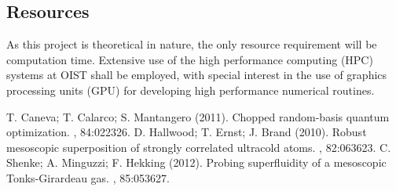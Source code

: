 \documentclass[fontsize=10pt, twocolumn]{scrartcl}	 %
\begin{document}

\subsection*{Resources}
As this project is theoretical in nature, the only resource requirement will be computation time. Extensive use of the high performance computing (HPC) systems
at OIST shall be employed, with special interest in the use of graphics processing units (GPU) for developing high performance numerical routines.

\begin{thebibliography}{99} %

 T. Caneva; T. Calarco; S. Mantangero (2011).
    \newblock Chopped random-basis quantum optimization.
    , 84:022326.
\vspace*{-10pt}
 D. Hallwood; T. Ernst; J. Brand (2010).
    \newblock Robust mesoscopic superposition of strongly correlated ultracold atoms.
    , 82:063623.
\vspace*{-10pt}
 C. Shenke; A. Minguzzi; F. Hekking (2012).
    \newblock Probing superfluidity of a mesoscopic Tonks-Girardeau gas.
    , 85:053627.
\end{thebibliography}
\end{document}
